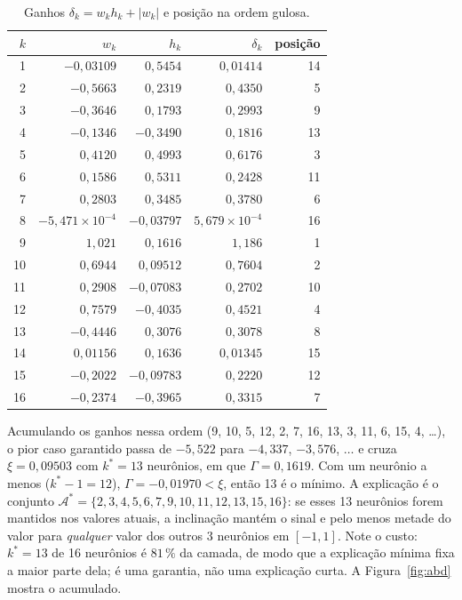 \documentclass[11pt,a4paper]{article}
\begin{document}
\begin{table}[H]
\centering
\caption{Ganhos $\delta_k=w_kh_k+|w_k|$ e posição na ordem gulosa.}\label{tab:gan}
\footnotesize
\begin{tabular}{rrrrr}
\toprule
$k$ & $w_k$ & $h_k$ & $\delta_k$ & posição \\
\midrule
1 & $-0,03109$ & $0,5454$ & $0,01414$ & 14 \\
2 & $-0,5663$ & $0,2319$ & $0,4350$ & 5 \\
3 & $-0,3646$ & $0,1793$ & $0,2993$ & 9 \\
4 & $-0,1346$ & $-0,3490$ & $0,1816$ & 13 \\
5 & $0,4120$ & $0,4993$ & $0,6176$ & 3 \\
6 & $0,1586$ & $0,5311$ & $0,2428$ & 11 \\
7 & $0,2803$ & $0,3485$ & $0,3780$ & 6 \\
8 & $-5,471\times 10^{-4}$ & $-0,03797$ & $5,679\times 10^{-4}$ & 16 \\
9 & $1,021$ & $0,1616$ & $1,186$ & 1 \\
10 & $0,6944$ & $0,09512$ & $0,7604$ & 2 \\
11 & $0,2908$ & $-0,07083$ & $0,2702$ & 10 \\
12 & $0,7579$ & $-0,4035$ & $0,4521$ & 4 \\
13 & $-0,4446$ & $0,3076$ & $0,3078$ & 8 \\
14 & $0,01156$ & $0,1636$ & $0,01345$ & 15 \\
15 & $-0,2022$ & $-0,09783$ & $0,2220$ & 12 \\
16 & $-0,2374$ & $-0,3965$ & $0,3315$ & 7 \\
\bottomrule
\end{tabular}
\par\vspace{2pt}{\footnotesize Fonte: elaborado pelo autor.}
\end{table}

Acumulando os ganhos nessa ordem (9, 10, 5, 12, 2, 7, 16, 13, 3, 11, 6, 15, 4, \ldots), o pior caso garantido passa de $-5,522$ para $-4,337$, $-3,576$, $\dots$ e cruza $\xi=0,09503$ com $k^*=13$ neurônios, em que $\Gamma=0,1619$. Com um neurônio a menos ($k^*-1=12$), $\Gamma=-0,01970<\xi$, então 13 é o mínimo. A explicação é o conjunto $\mathcal A^*=\{2, 3, 4, 5, 6, 7, 9, 10, 11, 12, 13, 15, 16\}$: se esses 13 neurônios forem mantidos nos valores atuais, a inclinação mantém o sinal e pelo menos metade do valor para \emph{qualquer} valor dos outros 3 neurônios em $[-1,1]$. Note o custo: $k^*=13$ de 16 neurônios é $81\,\%$ da camada, de modo que a explicação mínima fixa a maior parte dela; é uma garantia, não uma explicação curta. A Figura~\ref{fig:abd} mostra o acumulado.
\end{document}
